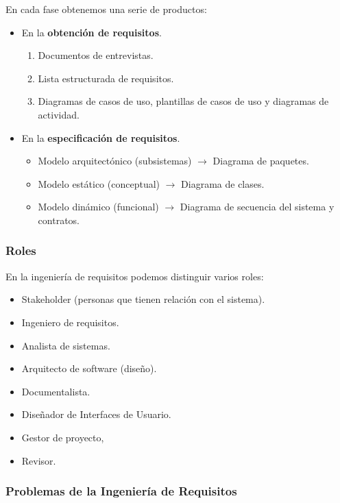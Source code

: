 \documentclass[12pt,spanish]{article}
\begin{document}
En cada fase obtenemos una serie de productos: 

\begin{itemize}
	\item En la \textbf{obtención de requisitos}.
		\begin{enumerate}
			\item Documentos de entrevistas.
			\item Lista estructurada de requisitos.
			\item Diagramas de casos de uso, plantillas de casos de uso y diagramas de actividad.
		\end{enumerate}
	\item En la \textbf{especificación de requisitos}.
		\begin{itemize}
			\item Modelo arquitectónico (subsistemas) $\rightarrow$ Diagrama de paquetes.
			\item Modelo estático (conceptual) $\rightarrow$ Diagrama de clases.
			\item Modelo dinámico (funcional) $\rightarrow$ Diagrama de secuencia del sistema y contratos.
		\end{itemize}
\end{itemize}

\subsubsection{Roles}

En la ingeniería de requisitos podemos distinguir varios roles: 

\begin{itemize}
	\item Stakeholder (personas que tienen relación con el sistema).
	\item Ingeniero de requisitos.
	\item Analista de sistemas.
	\item Arquitecto de software (diseño).
	\item Documentalista.
	\item Diseñador de Interfaces de Usuario.
	\item Gestor de proyecto,
	\item Revisor.
\end{itemize}

\subsubsection{Problemas de la Ingeniería de Requisitos}
\end{document}
